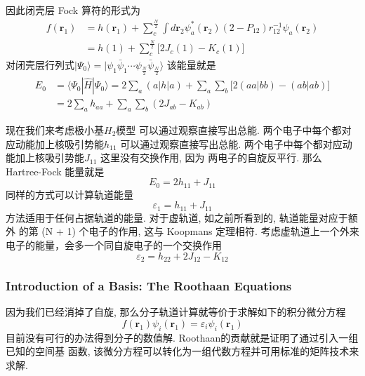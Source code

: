 \documentclass[fontset=none,12pt,a4paper]{ctexart}
\numberwithin{equation}{section}
\begin{document}
因此闭壳层 Fock 算符的形式为
\begin{equation}
  \begin{aligned}
  f(\mathbf{r}_1) &= h(\mathbf{r}_1)+\sum_{c}^{\frac{N}{2}}\int d\mathbf{r}_2\psi_a^*(\mathbf{r}_2)(2-P_{12})r_{12}^{-1}\psi_a(\mathbf{r}_2) \\
  &= h(1)+\sum_{c}^{\frac{N}{2}}\bigl[2J_c(1)-K_c(1)\bigr]
  \end{aligned}
\end{equation}
对闭壳层行列式$|\Psi_0\rangle=|\psi_1\bar{\psi}_1\cdots\psi_{\frac{N}{2}}\bar{\psi}_{\frac{N}{2}}\rangle$
该能量就是
\begin{equation}
  \begin{aligned}
      E_0 &=\langle\Psi_0|\hat{H}|\Psi_0\rangle
        =2\sum_a(a|h|a)+\sum_a\sum_b\bigl[2(aa|bb)-(ab|ab)\bigr] \\
      &=2\sum_a h_{aa}+\sum_a\sum_b(2J_{ab}-K_{ab})
  \end{aligned}
\end{equation}

现在我们来考虑极小基$H_2$模型
可以通过观察直接写出总能. 两个电子中每个都对应动能加上核吸引势能$h_11$
可以通过观察直接写出总能. 两个电子中每个都对应动能加上核吸引势能$J_11$
这里没有交换作用, 因为 两电子的自旋反平行. 那么 Hartree-Fock 能量就是
\begin{equation}
  E_0=2h_{11}+J_{11}
\end{equation}
同样的方式可以计算轨道能量
\begin{equation}
  \varepsilon_1 = h_{11}+J_{11}
\end{equation}
方法适用于任何占据轨道的能量. 对于虚轨道, 如之前所看到的, 
轨道能量对应于额外 的第 (N + 1) 个电子的作用, 这与 Koopmans 定理相符.
考虑虚轨道上一个外来电子的能量，会多一个同自旋电子的一个交换作用
\begin{equation}
  \varepsilon_2 = h_{22}+2J_{12}-K_{12}
\end{equation}
\subsubsection{Introduction of a Basis: The Roothaan Equations}
因为我们已经消掉了自旋, 那么分子轨道计算就等价于求解如下的积分微分方程
\begin{equation}
  f(\mathbf{r}_1)\psi_i(\mathbf{r}_1) = \varepsilon_i\psi_i(\mathbf{r}_1)
\end{equation}
目前没有可行的办法得到分子的数值解.
Roothaan的贡献就是证明了通过引入一组已知的空间基 函数,
该微分方程可以转化为一组代数方程并可用标准的矩阵技术来求解.
\end{document}
